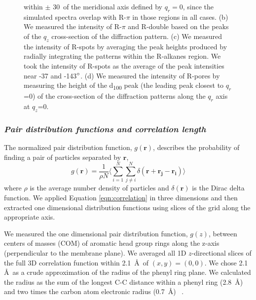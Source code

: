\documentclass[journal=jpcbfk,manuscript=article]{achemso}
\begin{document}
\begin{figure}[!htb]
{  within $\pm$ 30\degree~of the meridional axis defined by $q_r=0$, since the 
  simulated spectra overlap with R-$\pi$ in those regions in all cases. (b) We
  measured the intensity of R-$\pi$ and R-double based on the peaks of the $q_z$
  cross-section of the diffraction pattern. (c) We measured the intensity of R-spots
  by averaging the peak heights produced by radially integrating the patterns within 
  the R-alkanes region. We took the intensity of R-spots as the average of the 
  peak intensities near -37 and -143$\degree$. (d) We measured the intensity of 
  R-pores by measuring the height of the d\textsubscript{100} peak (the leading
  peak closest to $q_r$=0) of the cross-section of the diffraction patterns along
  the $q_r$ axis at $q_z$=0.} \label{fig:xrd_intensities}
  \end{figure}
 
  \subsubsection{\textit{Pair distribution functions and correlation length}}\label{section:correlation_length}

  The normalized pair distribution function, $g(\mathbf{r})$, describes
  the probability of finding a pair of particles separated by $\mathbf{r}$,
  \begin{equation}
	g(\mathbf{r})= \frac{1}{\rho N} \Bigg \langle \sum_{i=1}^{N}\sum_{j\neq i}^{N} \delta(\mathbf{r}+\mathbf{r_j}-\mathbf{r_i}) \Bigg \rangle
	\label{eqn:correlation}
  \end{equation}
  where $\rho$ is the average number density of particles and
  $\delta(\mathbf{r})$ is the Dirac delta function\cite{kuriabova_linear_2010}.
  We applied Equation \ref{eqn:correlation} in three dimensions and then
  extracted one dimensional distribution functions using slices of the grid
  along the appropriate axis.

  We measured the one dimensional pair distribution function, $g(z)$, between centers 
  of masses (COM) of aromatic head group rings along the z-axis (perpendicular to
  the membrane plane). We averaged all 1D $z$-directional slices of the full 3D 
  correlation function within 2.1~\AA~of $(x, y)=(0, 0)$. We chose 2.1 \AA~as a crude 
  approximation of the radius of the phenyl ring plane. 
  We calculated the radius as the sum of the longest C-C distance within a phenyl 
  ring (2.8~\AA) and two times the carbon atom electronic radius (0.7~\AA)
  ~\cite{slater_atomic_1964}. %
  
\end{document}

